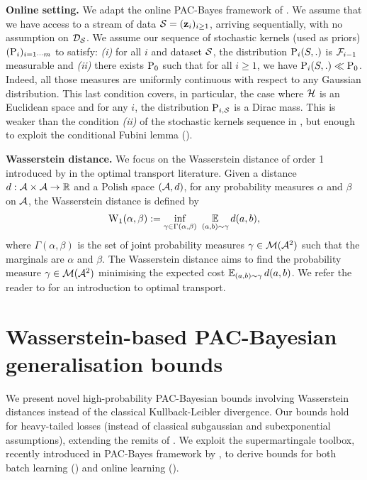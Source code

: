 \textbf{Online setting.}  
We adapt the online PAC-Bayes framework of .
We assume that we have access to a stream of data $\S=(\z_i)_{i\geq1}$, arriving sequentially, with no assumption on $\Dcal_{\S}$.
We assume our sequence of stochastic kernels (used as priors) $(\P_i)_{i=1\cdots m}$ to satisfy: {\it (i)} for all $i$ and dataset $\S$, the distribution $\P_i(S,.)$ is $\Fcal_{i-1}$ measurable and {\it (ii)} there exists $\P_0$ such that for all $i \geq 1$, we have $\P_i(S,.)\ll \P_{0}$. Indeed, all those measures are uniformly continuous with respect to any Gaussian distribution.
This last condition covers, in particular, the case where $\H$ is an Euclidean space and for any $i$, the distribution $\P_{i,\S}$ is a Dirac mass. This is weaker than the condition \textit{(ii)} of the stochastic kernels sequence in , but enough to exploit the conditional Fubini lemma ().
 

\textbf{Wasserstein distance.}
We focus on the Wasserstein distance of order 1 introduced by \cite{kantorovich1960mathematical} in the optimal transport literature. 
Given a distance $d: \Acal\times\Acal \to \Rbb$ and a Polish space $(\Acal, d)$, for any probability measures $\alpha$ and $\beta$ on $\Acal$, the Wasserstein distance is defined by
\begin{align}
\W_{1}(\alpha, \beta) \defeq \inf_{\gamma\in \Gamma(\alpha, \beta)}\
\EE_{(a, b)\sim\gamma}d(a, b),\label{eq:wasserstein}
\end{align}
where $\Gamma(\alpha, \beta)$ is the set of joint probability measures $\gamma \in \Mcal(\Acal^2)$ such that the marginals are $\alpha$ and $\beta$.
The Wasserstein distance aims to find the probability measure $\gamma\in\Mcal(\Acal^2)$ minimising the expected cost $\EE_{(a, b)\sim\gamma}d(a, b)$.
We refer the reader to \cite{villani2009optimal,peyre2019computational} for an introduction to optimal transport.

\section{Wasserstein-based PAC-Bayesian generalisation bounds}
\label{sec:wasserstein}

We present novel high-probability PAC-Bayesian bounds involving Wasserstein distances instead of the classical Kullback-Leibler divergence. 
Our bounds hold for heavy-tailed losses (instead of classical subgaussian and subexponential assumptions), extending the remits of \cite[Theorem 11]{amit2022integral}.
We exploit the supermartingale toolbox, recently introduced in PAC-Bayes framework by \cite{haddouche2023pac,chugg2023unified,jang2023tight}, to derive bounds for both batch learning () and online learning ().


